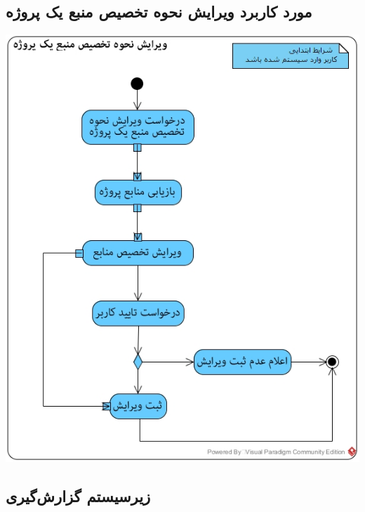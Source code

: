 \documentclass{article}
\begin{document}
\subsection*{مورد کاربرد ویرایش نحوه تخصیص منبع یک پروژه}
\vspace{2cm}
\begin{center}
\includegraphics[width=\textwidth]{ActivityDiagrams/39.jpg}
\end{center}



\newpage
\subsection{زیرسیستم گزارش‌گیری}

\vspace{2cm}
\end{document}
